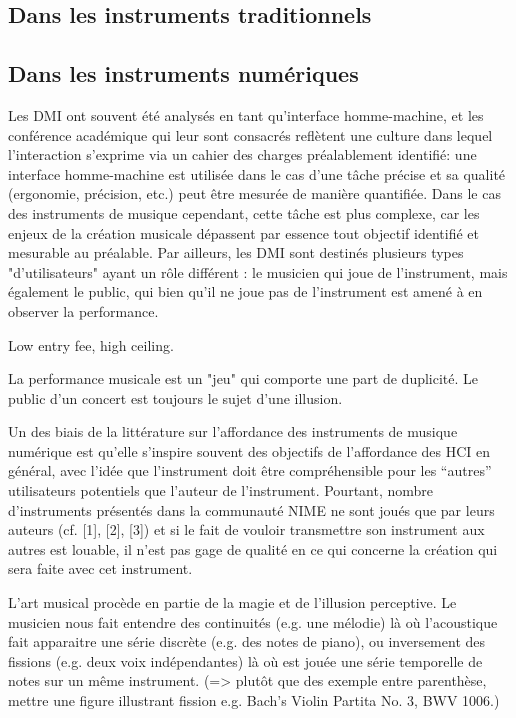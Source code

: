 \subsection{Dans les instruments traditionnels}

\subsection{Dans les instruments numériques}


Les DMI ont souvent été analysés en tant qu'interface homme-machine, et les conférence académique qui leur sont consacrés reflètent une culture dans lequel l'interaction s'exprime via un cahier des charges préalablement identifié: une interface homme-machine est utilisée dans le cas d'une tâche précise et sa qualité (ergonomie, précision, etc.) peut être mesurée de manière quantifiée.
Dans le cas des instruments de musique cependant, cette tâche est plus complexe, car les enjeux de la création musicale dépassent par essence tout objectif identifié et mesurable au préalable. Par ailleurs, les DMI sont destinés plusieurs types "d'utilisateurs" ayant un rôle différent : le musicien qui joue de l'instrument, mais également le public, qui bien qu'il ne joue pas de l'instrument est amené à en observer la performance.

Low entry fee, high ceiling.

La performance musicale est un "jeu" qui comporte une part de duplicité. Le public d'un concert est toujours le sujet d'une illusion. 

Un des biais de la littérature sur l’affordance des instruments de musique numérique est qu’elle s’inspire souvent des objectifs de l’affordance des HCI en général, avec l’idée que l’instrument doit être compréhensible pour les “autres” utilisateurs potentiels que l’auteur de l’instrument. Pourtant, nombre d’instruments présentés dans la communauté NIME ne sont joués que par leurs auteurs (cf. [1], [2], [3]) et si le fait de vouloir transmettre son instrument aux autres est louable, il n’est pas gage de qualité en ce qui concerne la création qui sera faite avec cet instrument. 


L'art musical procède en partie de la magie et de l'illusion perceptive. Le musicien nous fait entendre des continuités (e.g. une mélodie) là où l'acoustique fait apparaitre une série discrète (e.g. des notes de piano), ou inversement des fissions (e.g. deux voix indépendantes) là où est jouée une série temporelle de notes sur un même instrument. (=> plutôt que des exemple entre parenthèse, mettre une figure illustrant fission e.g. Bach's Violin Partita No. 3, BWV 1006.)

